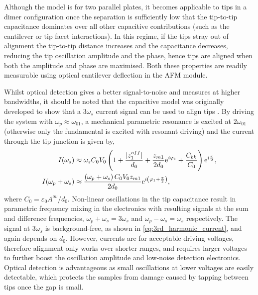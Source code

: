 \documentclass{article}
\begin{document}
Although the model is for two parallel plates, it becomes applicable to tips in a dimer configuration once the separation is sufficiently low that the tip-to-tip capacitance dominates over all other capacitive contributions (such as the cantilever or tip facet interactions). In this regime, if the tips stray out of alignment the tip-to-tip distance increases and the capacitance decreases, reducing the tip oscillation amplitude and the phase, hence tips are aligned when both the amplitude and phase are maximised. Both these properties are readily measurable using optical cantilever deflection in the AFM module.

Whilst optical detection gives a better signal-to-noise and measures at higher bandwidths, it should be noted that the capacitive model was originally developed to show that a $3\omega_s$ current signal can be used to align tips \cite{savage2011}. By driving the system with $\omega_p \approx \omega_{01}$, a mechanical parametric resonance is excited at $2\omega_{01}$ (otherwise only the fundamental is excited with resonant driving) and the current through the tip junction is given by,
\begin{subequations}
\begin{align}
I(\omega_{s}) & \approx \omega_{s}C_{0}V_{0} \left(1+\frac{|z_1^{off}|}{d_{0}}+\frac{z_{m1}}{2d_{0}}\e^{i\varphi_1}+\frac{C_{bk}}{C_{0}}\right)\e^{i\frac{\pi}{2}},\\
%
I(\omega_{p}+\omega_{s}) & \approx \frac{\left(\omega_{p}+\omega_{s}\right)C_{0}V_{0}z_{m1}}{2d_{0}} \e^{i\left(\varphi_1 + \frac{\pi}{2}\right)},
\label{eq:3rd_harmonic_current}
\end{align}
\end{subequations}
where $C_0 = \varepsilon_0 A^{ov} / d_0$. Non-linear oscillations in the tip capacitance result in parametric frequency mixing in the electronics with resulting signals at the sum and difference frequencies, $\omega_{p}+\omega_{s}=3\omega_{s}$ and $\omega_{p}-\omega_{s}=\omega_{s}$ respectively. The signal at $3\omega_{s}$ is background-free, as shown in \eqref{eq:3rd_harmonic_current}, and again depends on $d_{0}$. However, currents are  for acceptable driving voltages, therefore alignment only works over shorter ranges, and requires larger voltages to further boost the oscillation amplitude and low-noise detection electronics. Optical detection is advantageous as small oscillations at lower voltages are easily detectable, which protects the samples from damage caused by tapping between tips once the gap is small.
\end{document}
